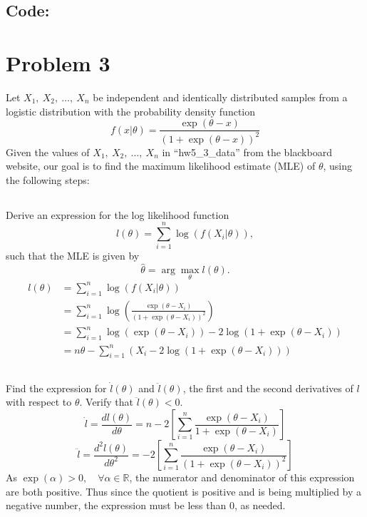 \documentclass[12pt]{article}
\begin{document}
	

	
\subsection*{Code:}
	
	
\section*{Problem 3}
	Let $ X_1,\ X_2,\ \dots,\ X_n $ be independent and identically distributed samples from a logistic distribution with the probability density function 
	\[ f(x|\theta)=\frac{\exp(\theta-x)}{(1+\exp(\theta-x))^2} \]
	Given the values of $ X_1,\ X_2,\ \dots,\ X_n $ in ``hw5\_3\_data'' from the blackboard website, our goal is to find the maximum likelihood estimate (MLE) of $ \theta $, using the following steps:
	
	\subsection{}
	Derive an expression for the log likelihood function 
	\[ l(\theta)=\sum_{i=1}^{n}\log(f(X_i|\theta)), \]
	such that the MLE is given by
	\[ \hat{\theta}=\arg\max_{\theta} l(\theta). \]
	\begin{align*}
		l(\theta)&=\sum_{i=1}^{n}\log(f(X_i|\theta)) \\
		&= \sum_{i=1}^{n}\log\left( \frac{\exp(\theta-X_i)}{(1+\exp(\theta-X_i))^2} \right)\\
		&=\sum_{i=1}^{n}\log(\exp(\theta-X_i))-2\log(1+\exp(\theta-X_i))\\
		&=n\theta -\sum_{i=1}^{n}\left( X_i- 2\log(1+\exp(\theta-X_i)) \right)
	\end{align*}	
	
	\subsection{}
	Find the expression for $ \dot{l}(\theta) $ and $ \ddot{l}(\theta) $, the first and the second derivatives of $ l $ with respect to $ \theta $. Verify that $ \ddot{l}(\theta)<0 $.
	\begin{equation*}
	\dot{l}=\frac{d l(\theta)}{d \theta}=n-2\left[\sum_{i=1}^{n} \frac{\exp(\theta-X_i)}{1+\exp(\theta-X_i)} \right]
	\end{equation*}
	\begin{equation*}
	\ddot{l}=\frac{d^2 l(\theta)}{d \theta^2}=-2\left[\sum_{i=1}^{n} \frac{\exp(\theta-X_i)}{(1+\exp(\theta-X_i))^2} \right]
	\end{equation*}
	As $ \exp(\alpha)>0,\quad \forall \alpha\in\mathbb{R} $, the numerator and denominator of this expression are both positive. Thus since the quotient is positive and is being multiplied by a negative number, the expression must be less than 0, as needed.
	
\end{document}
